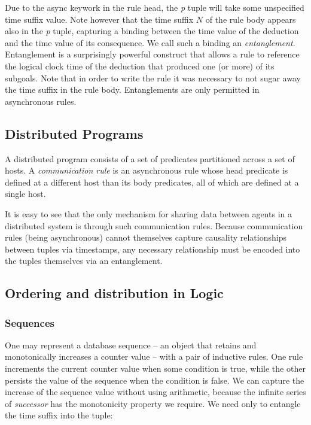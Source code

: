 Due to the async keywork in the rule head, the \emph{p} tuple will take some unspecified time suffix value.
Note however that the time suffix $N$ of the rule body appears also in the \emph{p} tuple, capturing a 
binding between the time value of the deduction and the time value of its consequence.  We call such a binding
an \emph{entanglement}.   Entanglement is a surprisingly powerful construct that allows a rule to 
reference the logical clock time of the deduction that produced one (or more) of its subgoals.  Note that in order
to write the rule it was necessary to not sugar away the time suffix in the rule body.  Entanglements are only 
permitted in asynchronous rules.

\subsection{Distributed Programs}

A distributed \lang program consists of a set of predicates partitioned across a set of hosts.
A \emph{communication rule} is an asynchronous rule whose head predicate is defined at a different host than its body predicates,
all of which are defined at a single host.  

It is easy to see that the only mechanism for sharing data between agents in a distributed system is through such communication 
rules.  Because communication rules (being asynchronous) cannot themselves capture causality relationships between tuples
via timestamps, any necessary relationship must be encoded into the tuples themselves via an entanglement.


\subsection{Ordering and distribution in Logic}

\subsubsection{Sequences}

One may represent a database sequence -- an object that retains and monotonically increases a counter value -- 
with a pair of inductive rules.  One rule increments the current counter value when some condition is 
true, while the other persists the value of the sequence when the condition is false.  We can capture the increase
of the sequence value without using arithmetic, because the infinite series of \emph{successor} has the monotonicity
property we require.  We need only to entangle the time suffix into the tuple:

